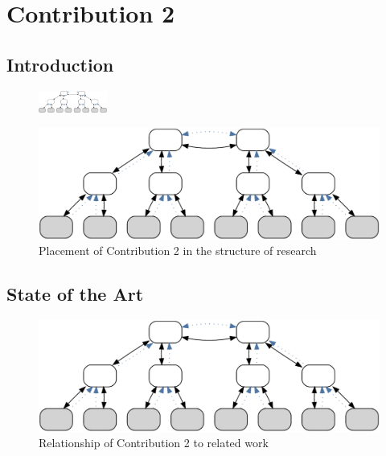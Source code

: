 \chapter{Contribution 2}\label{sec:contrib2}\minitoc\vspace{.5cm}

\section{Introduction}

\begin{figure}
    \centering
    \includegraphics[width=0.2\textwidth]{resources/images/example3}
\end{figure}



\begin{figure}[H]
    \centering
    \includegraphics[width=.55\textwidth]{resources/images/example3}
    \caption{Placement of Contribution 2 in the structure of research}\label{fig:hourglass:contrib2}
\end{figure}

\section{State of the Art}


\begin{figure}[htbp]
    \centering
    \includegraphics[width=.6\textwidth]{resources/images/example3}
    \caption{Relationship of Contribution 2 to related work}\label{fig:contrib2:related}
\end{figure}

